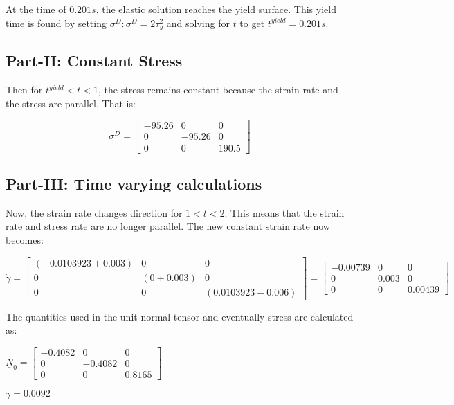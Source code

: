 \documentclass[10pt,letterpaper]{article}
\begin{document}
At the time of $0.201s$, the elastic solution reaches the yield surface.
This yield time is found by setting $\underline{\sigma}^{D}:\underline{\sigma}^{D}=2\tau_{y}^{2}$
and solving for $t$ to get $t^{yield}=0.201s$.


\subsection{Part-II: Constant Stress}

Then for $t^{yield}<t<1$, the stress remains constant because the
strain rate and the stress are parallel. That is:

\[
\underline{\sigma}^{D}=\left[\begin{array}{ccc}
-95.26 & 0 & 0\\
0 & -95.26 & 0\\
0 & 0 & 190.5
\end{array}\right]
\]



\subsection{Part-III: Time varying calculations}

Now, the strain rate changes direction for $1<t<2$. This means that
the strain rate and stress rate are no longer parallel. The new constant
strain rate now becomes:

\[
\dot{\underline{\gamma}}=\left[\begin{array}{ccc}
\left(-0.0103923+0.003\right) & 0 & 0\\
0 & \left(0+0.003\right) & 0\\
0 & 0 & \left(0.0103923-0.006\right)
\end{array}\right]=\left[\begin{array}{ccc}
-0.00739 & 0 & 0\\
0 & 0.003 & 0\\
0 & 0 & 0.00439
\end{array}\right]
\]


The quantities used in the unit normal tensor and eventually stress
are calculated as:

$\dot{\underline{N}}_{0}=\left[\begin{array}{ccc}
-0.4082 & 0 & 0\\
0 & -0.4082 & 0\\
0 & 0 & 0.8165
\end{array}\right]$

$\dot{\gamma}=0.0092$
\end{document}
